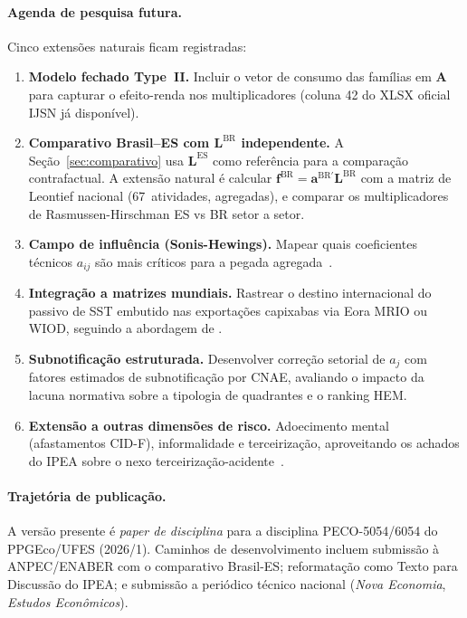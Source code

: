 \documentclass[12pt, a4paper]{article}
\begin{document}
\paragraph{Agenda de pesquisa futura.}
Cinco extensões naturais ficam registradas:

\begin{enumerate}
  \item \textbf{Modelo fechado Type~II.} Incluir o vetor de consumo
    das famílias em $\mathbf{A}$ para capturar o efeito-renda nos
    multiplicadores (coluna 42 do XLSX oficial IJSN já disponível).
  \item \textbf{Comparativo Brasil--ES com $\mathbf{L}^{\text{BR}}$
    independente.} A Seção~\ref{sec:comparativo} usa
    $\mathbf{L}^{\text{ES}}$ como referência para a comparação
    contrafactual. A extensão natural é calcular
    $\mathbf{f}^{\text{BR}} = \mathbf{a}^{\text{BR}{\prime}}\mathbf{L}^{\text{BR}}$
    com a matriz de Leontief nacional (67~atividades, agregadas), e
    comparar os multiplicadores de Rasmussen-Hirschman ES vs BR
    setor a setor.
  \item \textbf{Campo de influência (Sonis-Hewings).} Mapear quais
    coeficientes técnicos $a_{ij}$ são mais críticos para a pegada
    agregada~\citep{sonis1992field}.
  \item \textbf{Integração a matrizes mundiais.} Rastrear o destino
    internacional do passivo de SST embutido nas exportações capixabas
    via Eora MRIO ou WIOD, seguindo a abordagem de
    \citet{alsamawi2014employment}.
  \item \textbf{Subnotificação estruturada.} Desenvolver correção
    setorial de $a_j$ com fatores estimados de subnotificação por
    CNAE, avaliando o impacto da lacuna normativa sobre a tipologia
    de quadrantes e o ranking HEM.
  \item \textbf{Extensão a outras dimensões de risco.} Adoecimento
    mental (afastamentos CID-F), informalidade e terceirização,
    aproveitando os achados do IPEA sobre o nexo
    terceirização-acidente~\citep{ipea2018terc}.
\end{enumerate}

\paragraph{Trajetória de publicação.}
A versão presente é \textit{paper de disciplina} para a disciplina
PECO-5054/6054 do PPGEco/UFES (2026/1). Caminhos de desenvolvimento
incluem submissão à ANPEC/ENABER com o comparativo Brasil-ES;
reformatação como Texto para Discussão do IPEA; e submissão a
periódico técnico nacional (\textit{Nova Economia}, \textit{Estudos
Econômicos}).
\end{document}
